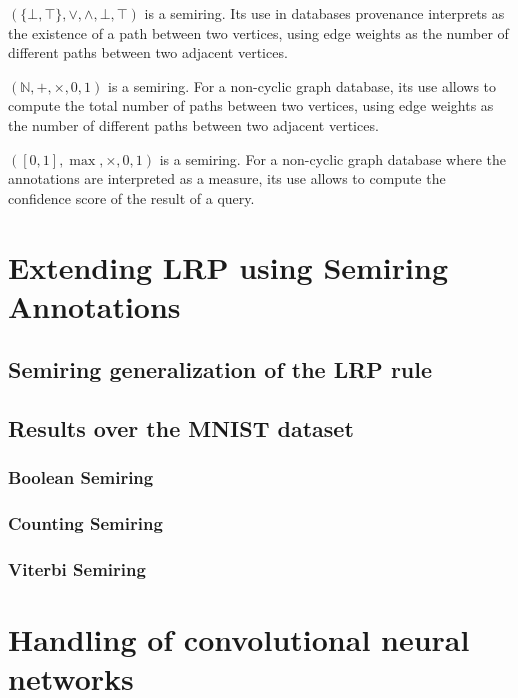 \documentclass{../cs-classes/cs-classes}
\begin{document}
\begin{example}
    $(\{\bot, \top\}, \lor, \land, \bot, \top)$ is a semiring. Its use in databases provenance interprets as the existence of a path between two vertices, using edge weights as the number of different paths between two adjacent vertices. 
\end{example}

\begin{example}
    $(\mathbb{N}, +, \times, 0, 1)$ is a semiring. For a non-cyclic graph database, its use allows to compute the total number of paths between two vertices, using edge weights as the number of different paths between two adjacent vertices.
\end{example}

\begin{example}
    $([0, 1], \max, \times, 0, 1)$ is a semiring. For a non-cyclic graph database where the annotations are interpreted as a  measure, its use allows to compute the confidence score of the result of a query.
\end{example}

\section{Extending LRP using Semiring Annotations}
\subsection{Semiring generalization of the LRP rule}
\subsection{Results over the MNIST dataset}
\subsubsection{Boolean Semiring}
\subsubsection{Counting Semiring}
\subsubsection{Viterbi Semiring}

\section{Handling of convolutional neural networks}
\end{document}
